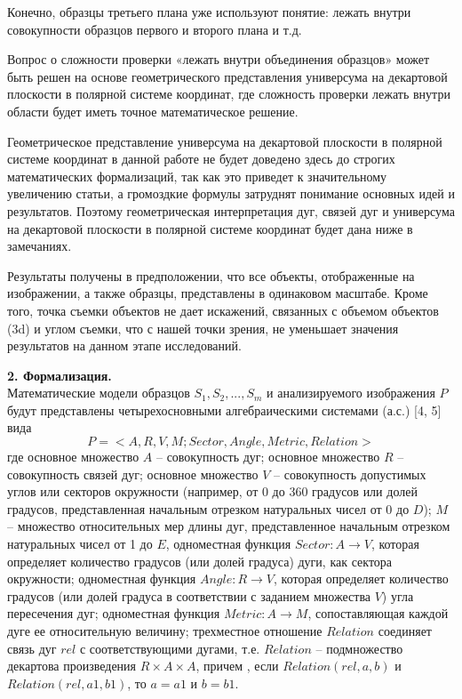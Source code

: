 Конечно,  образцы третьего плана уже используют понятие: лежать внутри  совокупности образцов первого и второго плана и т.д.

Вопрос о сложности проверки «лежать внутри объединения образцов» может быть решен на основе геометрического представления универсума на декартовой плоскости в полярной системе координат, где сложность проверки лежать внутри области будет иметь точное математическое решение.

Геометрическое представление универсума на декартовой плоскости в полярной системе координат в данной работе не будет доведено здесь до строгих математических формализаций, так как это приведет к значительному увеличению статьи, а громоздкие формулы затруднят понимание основных идей и результатов. Поэтому геометрическая интерпретация дуг, связей дуг и универсума на декартовой плоскости в полярной системе координат будет дана ниже в замечаниях.

Результаты получены в предположении, что все объекты, отображенные  на изображении, а также образцы, представлены в одинаковом масштабе. Кроме того, точка съемки объектов не дает искажений, связанных с объемом объектов (3d) и углом съемки, что с нашей точки зрения, не уменьшает значения результатов на данном этапе исследований.


\noindent
\textbf{2. Формализация.}
\\
Математические модели образцов $S_1, S_2, ..., S_m$  и анализируемого изображения $P$ будут представлены четырехосновными алгебраическими системами (а.с.) [4, 5] вида
\begin{equation}
P = < A, R, V, M; Sector,  Angle, Metric, Relation >
\label{overlaps:1}
\end{equation}
где  основное множество $A$ -- совокупность дуг; основное множество $R$ -- совокупность связей дуг; основное множество $V$ -- совокупность допустимых углов или  секторов окружности  (например, от 0 до 360 градусов или долей градусов, представленная  начальным  отрезком  натуральных чисел от 0 до $D$); $M$ -- множество относительных мер длины дуг, представленное  начальным отрезком натуральных чисел от 1 до $E$, одноместная функция $Sector: A \to V$, которая определяет количество градусов (или долей градуса) дуги,  как сектора окружности; одноместная функция  $Angle: R \to V$, которая  определяет количество градусов (или  долей градуса в соответствии с заданием множества $V$) угла пересечения дуг; одноместная функция  $Metric : A \to M$, сопоставляющая каждой дуге ее относительную величину; трехместное отношение $Relation$ соединяет связь дуг $rel$ с соответствующими дугами, т.е. $Relation$ -- подмножество декартова произведения  $R \times A \times A$, причем , если $Relation(rel , a, b)$  и $Relation(rel , a1, b1)$,  то $a = a1$  и  $b = b1$.

